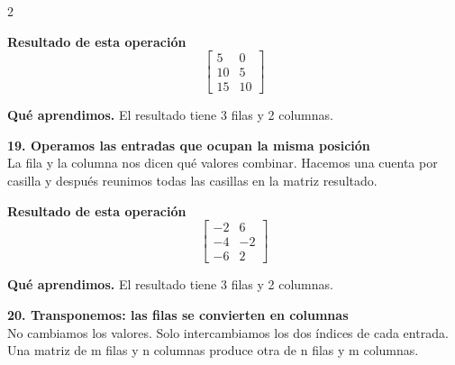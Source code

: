 \documentclass[11pt,a4paper,landscape]{article}
\begin{document}
\begin{multicols*}{2}
\begin{minipage}{\linewidth}
\par\smallskip \textbf{Resultado de esta operación}\[\begin{bmatrix}5 & 0\\10 & 5\\15 & 10\end{bmatrix}\]
\par\smallskip\textbf{Qué aprendimos.} El resultado tiene 3 filas y 2 columnas.
\end{minipage}\par\medskip
\noindent\begin{minipage}{\linewidth}\textbf{19. Operamos las entradas que ocupan la misma posición}\\[2pt]La fila y la columna nos dicen qué valores combinar. Hacemos una cuenta por casilla y después reunimos todas las casillas en la matriz resultado.
\par{}\par\smallskip
\par\smallskip \textbf{Resultado de esta operación}\[\begin{bmatrix}-2 & 6\\-4 & -2\\-6 & 2\end{bmatrix}\]
\par\smallskip\textbf{Qué aprendimos.} El resultado tiene 3 filas y 2 columnas.
\end{minipage}\par\medskip
\noindent\begin{minipage}{\linewidth}\textbf{20. Transponemos: las filas se convierten en columnas}\\[2pt]No cambiamos los valores. Solo intercambiamos los dos índices de cada entrada. Una matriz de m filas y n columnas produce otra de n filas y m columnas.

\end{minipage}
\end{multicols*}
\end{document}
